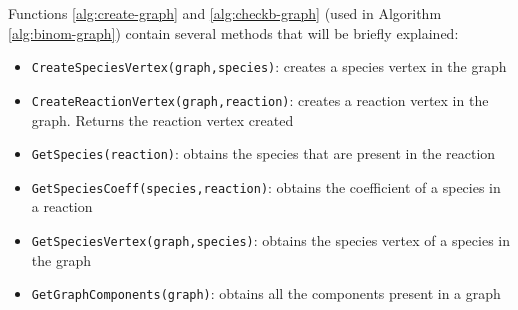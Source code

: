 \documentclass[11pt]{article}
\begin{document}
Functions \ref{alg:create-graph} and \ref{alg:checkb-graph} (used in Algorithm \ref{alg:binom-graph}) contain several methods that
will be briefly explained:
\begin{itemize}
\item \texttt{CreateSpeciesVertex(graph,species)}: creates a species vertex in
  the graph
\item \texttt{CreateReactionVertex(graph,reaction)}: creates a reaction vertex
  in the graph. Returns the reaction vertex created
\item \texttt{GetSpecies(reaction)}: obtains the species that are present in
  the reaction
\item \texttt{GetSpeciesCoeff(species,reaction)}: obtains the coefficient of a
  species in a reaction
\item \texttt{GetSpeciesVertex(graph,species)}: obtains the species vertex of a
  species in the graph
\item \texttt{GetGraphComponents(graph)}: obtains all the components present in
  a graph
\end{itemize}
\end{document}
